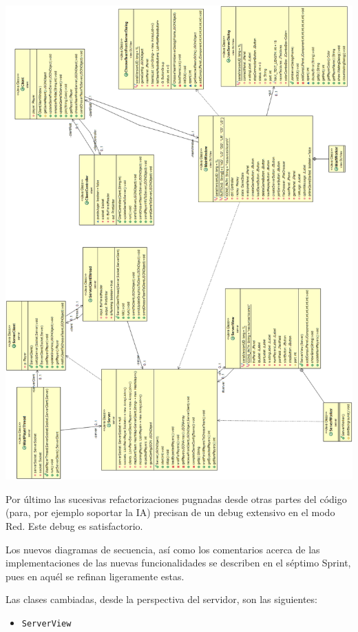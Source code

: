 \documentclass[../DocumentoOficial.tex]{subfiles}
\begin{document}
\begin{sprint}[6]
\begin{center}
\includegraphics[scale=0.45]{UMLClasesRedSprint6.png} 
\end{center}

\newpage
Por último las sucesivas refactorizaciones pugnadas desde otras partes del código (para, por ejemplo soportar la IA) precisan de un debug extensivo en el modo Red. Este debug es satisfactorio.

Los nuevos diagramas de secuencia, así como los comentarios acerca de las implementaciones de las nuevas funcionalidades se describen en el séptimo Sprint, pues en aquél se refinan ligeramente estas.

Las clases cambiadas, desde la perspectiva del servidor, son las siguientes:

\begin{itemize}

\item \texttt{ServerView}


\end{itemize}
\end{sprint}
\end{document}
